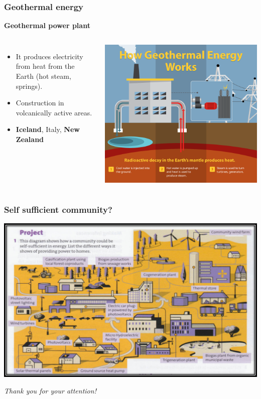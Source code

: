 \documentclass[usepdftitle=true]{beamer}
\begin{document}
\begin{frame}
	\frametitle{Geothermal energy}
	\textbf{Geothermal power plant}
	\begin{columns}
			\begin{itemize}
				\item It produces electricity from heat from the Earth (hot steam, springs).
				\item Construction in volcanically active areas.
				\item \textbf{Iceland}, Italy, \textbf{New Zealand}
			\end{itemize}
			\includegraphics[scale=0.2]{img/geothermal-energy.png}
	\end{columns}
\end{frame}

\begin{frame}
	\frametitle{Self sufficient community?}
	\includegraphics[scale=0.45]{img/textbook.png}
\end{frame}

\begin{frame}
	\centering \Huge \emph{Thank you for your attention!}
\end{frame}
\end{document}
